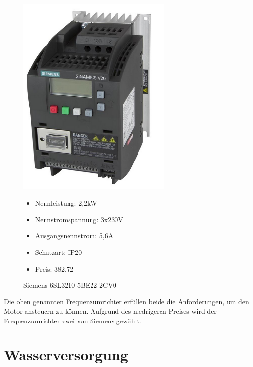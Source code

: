 \begin{figure}
\begin{minipage}[t]{0.45\textwidth}
\includegraphics[width=0.68\textwidth]{SiemensV20}
\caption{Siemens-6SL3210-5BE22-2CV0}

\begin{itemize}
	\item{Nennleistung: 2,2kW}
	\item{Nennstromspannung: 3x230V}
	\item{Ausgangsnennstrom: 5,6A}
	\item{Schutzart: IP20}
	\item{Preis: 382,72\textsf{\texteuro}}
\end{itemize}

\end{minipage}
\end{figure}

Die oben genannten Frequenzumrichter erfüllen beide die Anforderungen, um den Motor ansteuern zu können. Aufgrund des niedrigeren Preises wird der Frequenzumrichter zwei von Siemens gewählt. 


\newpage
\section{Wasserversorgung}
\label{sec:wasserversorgung}

